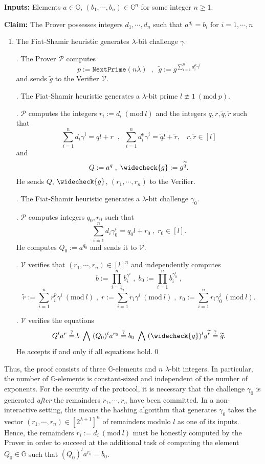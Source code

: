 \documentclass[11pt, lettersize, notitlepage, leqno, footskip=0.6cm]{article}
\newcommand{\slim}{\sum\limits}
\newcommand{\ttt}{\texttt}
\newcommand{\wti}{\widetilde}
\newcommand{\mc}{\mathcal}
\newcommand{\mb}{\mathbb}
\newcommand{\lam}{\lambda}
\newcommand{\lamb}{\lambda}
\newcommand{\weck}{\widecheck}
\newcommand{\mP}{\mc{P}}
\newcommand{\V}{\mc{V}}
\newcommand{\vs}{\vspace{-0.15cm}}
\newcommand{\noin}{\noindent}
\newcommand{\sta}{\stackrel{?}{=}}
\newcommand{\Mod}[1]{\ (\mathrm{mod}\ #1)}
\numberwithin{equation}{section}
\begin{document}
\noindent \textbf{Inputs:} Elements $a\in\mb{G} $, $(b_1,\cdots,b_n)\in \mb{G}^n$ for some integer $n\geq 1$.

\noindent \textbf{Claim:} The Prover possesses integers $d_1,\cdots, d_n$ such that $a^{d_i} = b_i$ for $i = 1,\cdots, n$

\begin{enumerate}[wide, labelwidth=!, labelindent=0pt]\vs \item \normalfont The Fiat-Shamir heuristic generates $\lamb$-bit challenge $\gamma$.

\noin 2. The Prover $\mc{P}$ computes \vs $$p:= \ttt{NextPrime}(n\lam)\;\;,\;\;\wti{g} := g^{\sum\limits_{i=1}^n d_i^{p}\gamma^i}$$ and sends $\wti{g}$ to the Verifier $\mc{V}$.


\noin 3. The Fiat-Shamir heuristic generates a $\lam$-bit prime $l\not\equiv 1\Mod{p}$. 

\noin 4. $\mc{P}$ computes the integers $r_i:= d_i\Mod{l}$ and the integers $q, r,\wti{q},\wti{r}$ such that \vs $$\slim_{i=1}^n d_i\gamma^i = ql+r\;\;,\;\; \slim_{i=1}^n d_i^{p}\gamma^i = \wti{q}l+\wti{r},\;\;\;r,\wti{r}\in[l]$$ and \vs $$Q:= a^q\;,\; \weck{g}:= g^{\wti{q}}.$$ He sends $Q$, $\weck{g}$, $(r_1,\cdots,r_n)$ to the Verifier.

\noin 5. The Fiat-Shamir heuristic generates a $\lam$-bit challenge $\gamma_0$.

\noin 6. $\mP$ computes integers $q_0, r_0$ such that \vs $$\slim_{i=1}^n d_i\gamma_0^i = q_0l+r_0\;,\;r_0\in[l] .$$ He computes $Q_0:= a^{q_0}$ and sends it to $\V.$

. $\mc{V}$ verifies that $(r_1,\cdots,r_n)\in [l]^n$ and independently computes \vs $$b := \prod\limits_{i=1}^n b_i^{\gamma^i}\;,\;b_0 := \prod\limits_{i=1}^n b_i^{\gamma_0^i}\;,$$ \vspace{-0.2cm} $$\wti{r}:= \slim_{i=1}^n r_i^{p}\gamma^i\Mod{l}\;,\;r:= \slim_{i=1}^n r_i\gamma^i\Mod{l}\;,\;r_0:=\slim_{i=1}^n r_i\gamma_0^i\Mod{l}.$$ 

\noin 8. $\V$ verifies the equations \vs $$Q^la^r\sta b\;\bigwedge\;(Q_0)^la^{r_0}\sta b_0\;\bigwedge\; (\weck{g})^lg^{\wti{r}}\sta\wti{g}.$$ He accepts if and only if all equations hold.\qed  \end{enumerate}

Thus, the proof consists of three $\mb{G}$-elements and $n$ $\lam$-bit integers. In particular, the number of $\mb{G}$-elements is constant-sized and independent of the number of exponents. For the security of the protocol, it is necessary that the challenge $\gamma_0$ is generated \textit{after} the remainders $r_1,\cdots,r_n$ have been committed. In a non-interactive setting, this means the hashing algorithm that generates $\gamma_0$ takes the vector $(r_1,\cdots,r_n)\in [2^{\lam+1}]^n$ of remainders modulo $l$ as one of its inputs. Hence, the remainders $r_i:= d_i\Mod{l}$ must be honestly computed by the Prover in order to succeed at the additional task of computing the element $Q_0\in\mb{G}$ such that $(Q_0)^la^{r_0} = b_0$.
\end{document}

